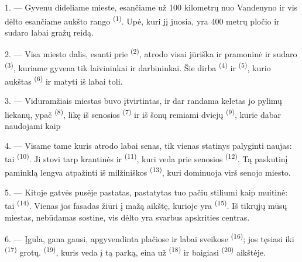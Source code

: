 \VUsaut{3.0mm}

1. --- Gyvenu dideliame mieste, esančiame už 100 kilometrų nuo Vandenyno ir vis dėlto
esančiame aukšto rango  \textsuperscript{(1)}. Upė, kuri jį juosia, yra
400 metrų pločio ir sudaro labai gražų reidą.

2. --- Visa miesto dalis, esanti prie  \textsuperscript{(2)},
atrodo visai jūriška ir pramoninė ir sudaro 
\textsuperscript{(3)}, kuriame gyvena tik laivininkai ir darbininkai. Šie dirba
 \textsuperscript{(4)} ir  \textsuperscript{(5)},
kurio aukštas  \textsuperscript{(6)} ir 
matyti iš labai toli.

3. --- Viduramžiais miestas buvo įtvirtintas, ir dar randama keletas jo pylimų
liekanų, ypač  \textsuperscript{(8)}, likę iš senosios  \textsuperscript{(7)} ir iš šonų remiami dviejų 
\textsuperscript{(9)},
kurie dabar naudojami kaip 

4. --- Visame tame  kuris atrodo labai senas, tik vienas statinys
palyginti naujas: tai  \textsuperscript{(10)}. Ji stovi tarp krantinės
ir  \textsuperscript{(11)}, kuri veda prie senosios 
\textsuperscript{(12)}. Tą paskutinį paminklą lengva atpažinti iš milžiniškos
 \textsuperscript{(13)}, kuri dominuoja virš senojo miesto.

5. --- Kitoje gatvės pusėje  pastatas, pastatytas tuo pačiu stiliumi
kaip muitinė: tai  \textsuperscript{(14)}. Vienas jos fasadas žiūri į
mažą aikštę, kurioje yra  \textsuperscript{(15)}. Iš tikrųjų
mūsų miestas, nebūdamas sostine, vis dėlto yra svarbus apskrities centras.

\VUsaut{5.0mm}
\VUsaut{3.4mm}

6. --- Įgula, gana gausi, apgyvendinta plačiose ir labai sveikose
 \textsuperscript{(16)}; jos tęsiasi iki 
\textsuperscript{(17)} grotų.  \textsuperscript{(19)}, kuris veda į tą
parką, eina už  \textsuperscript{(18)} ir baigiasi
 \textsuperscript{(20)} aikštėje.

